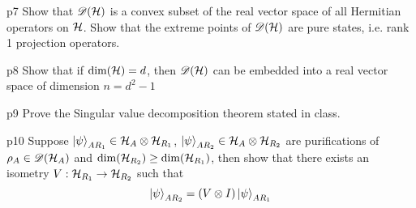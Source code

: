 \documentclass[a4paper, 11pt]{article}
\begin{document}
\begin{problem}{%
	}{p7%
	}
Show that ${\mathscr{D}}(\mathcal{H})$ is a convex subset of the real vector space of all Hermitian operators on $\mathcal{H}$. Show that the extreme points of ${\mathscr{D}}(\mathcal{H})$ are pure states, i.e.  rank 1 projection operators.
\end{problem}


\begin{problem}{%
	}{p8%
	}
Show that if $\dim(\mathcal{H})=d$, then ${\mathscr{D}}(\mathcal{H})$ can be embedded  into a real vector space  of dimension $n=d^2-1$
\end{problem}


\begin{problem}{%
	}{p9%
	}
Prove the Singular value decomposition theorem stated in class.	%
\end{problem}


\begin{problem}{%
	}{p10%
	}
	Suppose $\ket{\psi}_{AR_1}\in \mathcal{H}_{A}\otimes \mathcal{H}_{R_1}$, $\ket{\psi}_{AR_2}\in \mathcal{H}_A\otimes \mathcal{H}_{R_2}$ are purifications of  $\rho_A\in {\mathscr{D}}(\mathcal{H}_A)$ and $\dim(\mathcal{H}_{R_2})\geq \dim(\mathcal{H}_{R_1})$, then show that  there exists an isometry $V:\mathcal{H}_{R_1}\to \mathcal{H}_{R_2}$  such that $$\ket{\psi}_{AR_2}=(V\otimes I)\ket{\psi}_{AR_1}$$
\end{problem}

\end{document}

